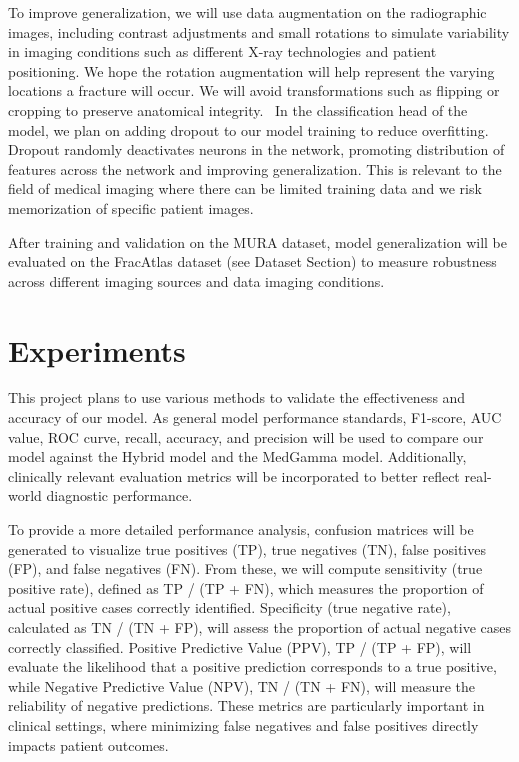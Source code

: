 \documentclass[conference]{IEEEtran}
\begin{document}
To improve generalization, we will use data augmentation on the radiographic images, including contrast adjustments and small rotations to simulate variability in imaging conditions such as different X-ray technologies and patient positioning. We hope the rotation augmentation will help represent the varying locations a fracture will occur. We will avoid transformations such as flipping or cropping to preserve anatomical integrity.  In the classification head of the model, we plan on adding dropout to our model training to reduce overfitting. Dropout randomly deactivates neurons in the network, promoting distribution of features across the network and improving generalization. This is relevant to the field of medical imaging where there can be limited training data and we risk memorization of specific patient images. 

After training and validation on the MURA dataset, model generalization will be evaluated on the FracAtlas dataset (see Dataset Section) to measure robustness across different imaging sources and data imaging conditions. 


\section{Experiments}
This project plans to use various methods to validate the effectiveness and accuracy of our model. As general model performance standards, F1-score, AUC value, ROC curve, recall, accuracy, and precision will be used to compare our model against the Hybrid model and the MedGamma model. Additionally, clinically relevant evaluation metrics will be incorporated to better reflect real-world diagnostic performance.

To provide a more detailed performance analysis, confusion matrices will be generated to visualize true positives (TP), true negatives (TN), false positives (FP), and false negatives (FN). From these, we will compute sensitivity (true positive rate), defined as TP / (TP + FN), which measures the proportion of actual positive cases correctly identified. Specificity (true negative rate), calculated as TN / (TN + FP), will assess the proportion of actual negative cases correctly classified. Positive Predictive Value (PPV), TP / (TP + FP), will evaluate the likelihood that a positive prediction corresponds to a true positive, while Negative Predictive Value (NPV), TN / (TN + FN), will measure the reliability of negative predictions. These metrics are particularly important in clinical settings, where minimizing false negatives and false positives directly impacts patient outcomes.
\end{document}
